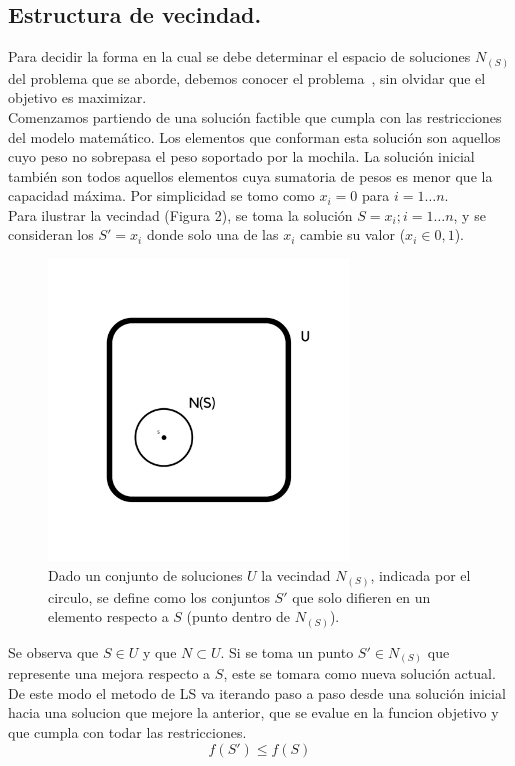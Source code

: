 \documentclass{ci5652}
\begin{document}
	\subsection{Estructura de vecindad.}
	Para decidir la forma en la cual se debe determinar el espacio de soluciones $N_{(S)}$ del problema que se aborde, debemos conocer el problema~\cite{c_KP_02}, sin olvidar que el objetivo es maximizar.\\
	Comenzamos partiendo de una solución factible que cumpla con las restricciones del modelo matemático. Los elementos que conforman esta solución son aquellos cuyo peso no sobrepasa el peso soportado por la mochila. La solución inicial también son todos aquellos elementos cuya sumatoria de pesos es menor que la capacidad máxima. Por simplicidad se tomo como $x_i = 0$ para $i = 1\ldots n$.\\
	Para ilustrar la vecindad (Figura 2), se toma la solución $S = {x_i};i =1\ldots n$, y se consideran los $S'={x_i}$ donde solo una de las $x_i$ cambie su valor ($x_i \in {0,1}$).

 	\begin{figure}[h]
 	\caption{Dado un conjunto de soluciones $U$ la vecindad $N_{(S)}$, indicada por el circulo, se define como los conjuntos $S'$ que solo difieren en un elemento respecto a $S$ (punto dentro de $N_{(S)}$).}
	\includegraphics[width=8cm, height=8cm]{Vecindad.png}
	\end{figure}

	Se observa que $S \in U$ y que $N \subset U$. Si se toma un punto $S' \in N_{(S)}$ que represente una mejora respecto a $S$, este se tomara como nueva solución actual. De este modo el metodo de LS va iterando paso a paso desde una solución inicial hacia una solucion que mejore la anterior, que se evalue en la funcion objetivo y que cumpla con todar las restricciones.
	$$
	f(S') \leq f(S)
	$$
\end{document}
